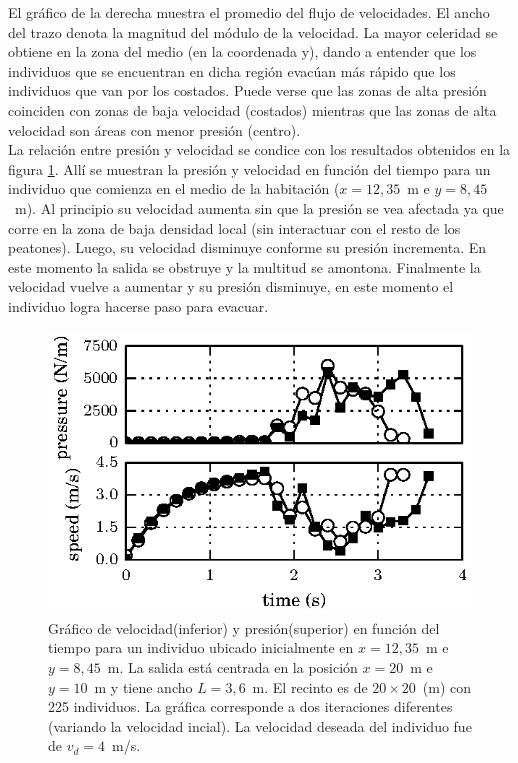 El gráfico de la derecha muestra el promedio del flujo de velocidades. El ancho del trazo denota la magnitud del módulo de la velocidad. La mayor celeridad se obtiene en la zona del medio (en la coordenada y), dando a entender que los individuos que se encuentran en dicha región evacúan más rápido que los individuos que van por los costados. 
Puede verse que las zonas de alta presión coinciden con zonas de baja velocidad (costados) mientras que las zonas de alta velocidad son áreas con menor presión (centro). \\

La relación entre presión y velocidad se condice con los resultados obtenidos en la figura \ref{pa_vel_t_100_3_6}. Allí se muestran la presión y velocidad en función del tiempo para un individuo que comienza en el medio de la habitación ($x=12,35$~m e $y=8,45$~m). Al principio su velocidad aumenta sin que la presión se vea afectada ya que corre en la zona de baja densidad local (sin interactuar con el resto de los peatones). Luego, su velocidad disminuye conforme su presión incrementa. En este momento la salida se obstruye y la multitud se amontona. Finalmente la velocidad vuelve a aumentar y su presión disminuye, en este momento el individuo logra hacerse paso para evacuar. 

\begin{figure}[H]
    \centering
    \includegraphics[scale=1.6]{figuras/p_vel_t_100_3_6.eps}
    \caption[width=5cm]{Gráfico de velocidad(inferior) y presión(superior) en función del tiempo para un individuo ubicado inicialmente en $x=12,35$~m e $y=8,45$~m.  La salida está centrada en la posición $x=20$~m e $y=10$~m y tiene ancho $L=3,6$~m. El recinto es de $20\times 20$~(m) con 225 individuos. La gráfica corresponde a dos iteraciones diferentes (variando la velocidad incial). La velocidad deseada del individuo fue de $v_d=4$~m/s.}
    \label{pa_vel_t_100_3_6}
\end{figure}

